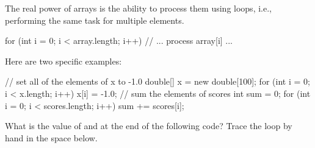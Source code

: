 



The real power of arrays is the ability to process them using loops, i.e., performing the same task for multiple elements.

\begin{javalst}
    for (int i = 0; i < array.length; i++) {
       // ... process array[i] ...
    }
\end{javalst}

Here are two specific examples:

\begin{javalst}
    // set all of the elements of x to -1.0
    double[] x = new double[100];
    for (int i = 0; i < x.length; i++) {
        x[i] = -1.0;
    }
    // sum the elements of scores
    int sum = 0;
    for (int i = 0; i < scores.length; i++) {
        sum += scores[i];
    }
\end{javalst}




\Q What is the value of  and  at the end of the following code?
Trace the loop by hand in the space below.



